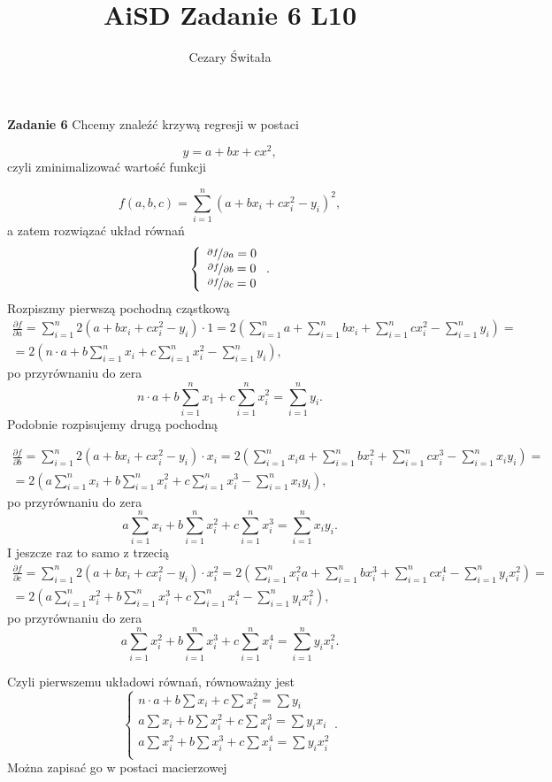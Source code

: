 \documentclass[12pt,a4paper]{article}
\title{AiSD Zadanie 6 L10}
\author{Cezary Świtała}
\begin{document}
\noindent
\textbf{Zadanie 6} Chcemy znaleźć krzywą regresji w postaci

\[
y = a + bx + cx^2,
\]
czyli zminimalizować wartość funkcji

\[
f(a,b,c) = \sum_{i=1}^{n} (a + bx_i + cx_i^2 - y_i)^2,
\]
a zatem rozwiązać układ równań
\[
\left\{
	\begin{array}{c}
		\nicefrac{\partial f}{\partial a} = 0 	\\
		\nicefrac{\partial f}{\partial b} = 0 	\\
		\nicefrac{\partial f}{\partial c} = 0 	\\
	\end{array}\right..
\]
Rozpiszmy pierwszą pochodną cząstkową
\begin{gather*}
	\frac{\partial f}{\partial a} = \sum_{i=1}^n 2( a + bx_i + c x_i^2 - y_i) \cdot 1 = 
	2 \left( \sum_{i=1}^n a + \sum_{i=1}^n bx_i + \sum_{i=1}^n c x_i^2 - \sum_{i=1}^n y_i \right) = \\
	= 2 \left( n \cdot a + b\sum_{i=1}^n x_i + c\sum_{i=1}^n x_i^2 - \sum_{i=1}^n y_i \right),
\end{gather*}
po przyrównaniu do zera
\[
	n \cdot a + b\sum_{i=1}^n x_1 + c\sum_{i=1}^n x_i^2 = \sum_{i=1}^n y_i.
\]
Podobnie rozpisujemy drugą pochodną

\begin{gather*}
	\frac{\partial f}{\partial b} = \sum_{i=1}^n 2( a + bx_i + c x_i^2 - y_i) \cdot x_i = 
	2 \left( \sum_{i=1}^n x_ia + \sum_{i=1}^n bx_i^2 + \sum_{i=1}^n c x_i^3 - \sum_{i=1}^n x_i y_i \right) = \\
	= 2 \left( a \sum_{i=1}^n x_i + b\sum_{i=1}^n x_i^2 + c\sum_{i=1}^n x_i^3 - \sum_{i=1}^n x_i y_i \right),
\end{gather*}
po przyrównaniu do zera
\[
	a \sum_{i=1}^n x_i + b\sum_{i=1}^n x_i^2 + c\sum_{i=1}^n x_i^3 = \sum_{i=1}^n x_i y_i.
\]
I jeszcze raz to samo z trzecią
\begin{gather*}
	\frac{\partial f}{\partial c} = \sum_{i=1}^n 2( a + bx_i + c x_i^2 - y_i) \cdot x_i^2 = 
	2 \left( \sum_{i=1}^n x_i^2 a + \sum_{i=1}^n bx_i^3 + \sum_{i=1}^n c x_i^4 - \sum_{i=1}^n y_i x_i^2 \right) = \\
	= 2 \left( a \sum_{i=1}^n x_i^2 + b\sum_{i=1}^n x_i^3 + c\sum_{i=1}^n x_i^4 - \sum_{i=1}^n y_i x_i^2 \right),
\end{gather*}
po przyrównaniu do zera
\[
	a \sum_{i=1}^n x_i^2 + b\sum_{i=1}^n x_i^3 + c\sum_{i=1}^n x_i^4 = \sum_{i=1}^n y_i x_i^2.
\]

\newpage
\noindent
Czyli pierwszemu układowi równań, równoważny jest 
 \[
\left\{
	\begin{array}{c}
		n \cdot a + b\sum x_i + c\sum x_i^2 = \sum y_i 	\\
		a \sum x_i + b\sum x_i^2 + c\sum x_i^3 = \sum y_i x_i 	\\
		a \sum x_i^2 + b\sum x_i^3 + c\sum x_i^4 = \sum y_i x_i^2	\\
	\end{array}\right..
\]
Można zapisać go w postaci macierzowej
\end{document}
